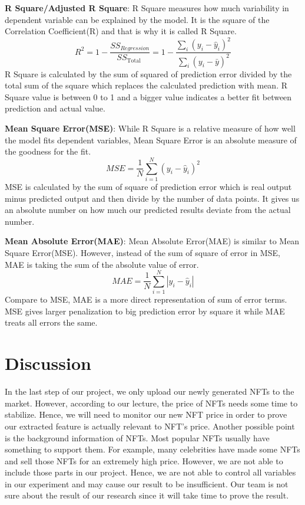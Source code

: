 \textbf{R Square/Adjusted R Square}: R Square measures how much variability in dependent variable can be explained by the model. It is the square of the Correlation Coefficient(R) and that is why it is called R Square.
$$R^{2}=1-\frac{S S_{R e g r e s s i o n}}{S S_{\text {Total }}}=1-\frac{\sum_{i}\left(y_{i}-\hat{y}_{i}\right)^{2}}{\sum_{i}\left(y_{i}-\bar{y}\right)^{2}}$$
R Square is calculated by the sum of squared of prediction error divided by the total sum of the square which replaces the calculated prediction with mean. R Square value is between 0 to 1 and a bigger value indicates a better fit between prediction and actual value.

\textbf{Mean Square Error(MSE)}: While R Square is a relative measure of how well the model fits dependent variables, Mean Square Error is an absolute measure of the goodness for the fit.
$$M S E=\frac{1}{N} \sum_{i=1}^{N}\left(y_{i}-\hat{y}_{i}\right)^{2}$$
MSE is calculated by the sum of square of prediction error which is real output minus predicted output and then divide by the number of data points. It gives us an absolute number on how much our predicted results deviate from the actual number.

\textbf{Mean Absolute Error(MAE)}: Mean Absolute Error(MAE) is similar to Mean Square Error(MSE). However, instead of the sum of square of error in MSE, MAE is taking the sum of the absolute value of error.
$$M A E=\frac{1}{N} \sum_{i=1}^{N}\left|y_{i}-\hat{y}_{i}\right|$$
Compare to MSE, MAE is a more direct representation of sum of error terms. MSE gives larger penalization to big prediction error by square it while MAE treats all errors the same.

\section{Discussion}

In the last step of our project, we only upload our newly generated NFTs to the market. However, according to our lecture, the price of NFTs needs some time to stabilize. Hence, we will need to monitor our new NFT price in order to prove our extracted feature is actually relevant to NFT’s price. Another possible point is the background information of NFTs. Most popular NFTs usually have something to support them. For example, many celebrities have made some NFTs and sell those NFTs for an extremely high price. However, we are not able to include those parts in our project. Hence, we are not able to control all variables in our experiment and may cause our result to be insufficient. Our team is not sure about the result of our research since it will take time to prove the result.

